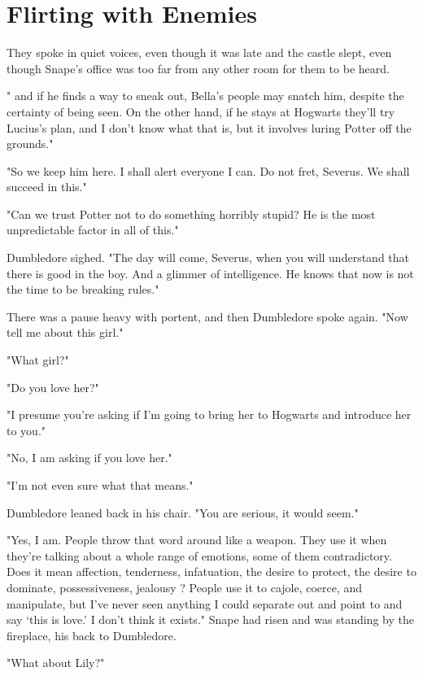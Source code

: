 
\chapter{Flirting with Enemies}

They spoke in quiet voices, even though it was late and the castle slept, even though Snape's office was too far from any other room for them to be heard.

"{\el} and if he finds a way to sneak out, Bella's people may snatch him, despite the certainty of being seen. On the other hand, if he stays at Hogwarts they'll try Lucius's plan, and I don't know what that is, but it involves luring Potter off the grounds."

"So we keep him here. I shall alert everyone I can. Do not fret, Severus. We shall succeed in this."

"Can we trust Potter not to do something horribly stupid? He is the most unpredictable factor in all of this."

Dumbledore sighed. "The day will come, Severus, when you will understand that there is good in the boy. And a glimmer of intelligence. He knows that now is not the time to be breaking rules."

There was a pause heavy with portent, and then Dumbledore spoke again. "Now tell me about this girl."

"What girl?"

"Do you love her?"

"I presume you're asking if I'm going to bring her to Hogwarts and introduce her to you."

"No, I am asking if you love her."

"I'm not even sure what that means."

Dumbledore leaned back in his chair. "You are serious, it would seem."

"Yes, I am. People throw that word around like a weapon. They use it when they're talking about a whole range of emotions, some of them contradictory. Does it mean affection, tenderness, infatuation, the desire to protect, the desire to dominate, possessiveness, jealousy{\el} ? People use it to cajole, coerce, and manipulate, but I've never seen anything I could separate out and point to and say `this is love.' I don't think it exists." Snape had risen and was standing by the fireplace, his back to Dumbledore.

"What about Lily?"

